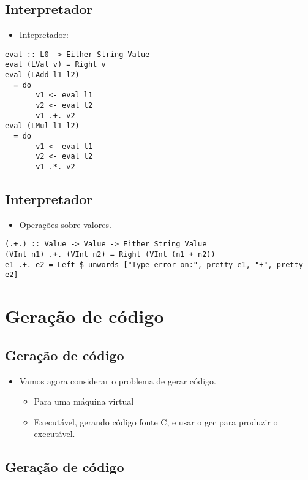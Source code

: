 \documentclass[11pt]{article}
\begin{document}
\subsection*{Interpretador}
\label{sec:org8eb00e1}

\begin{itemize}
\item Intepretador:
\end{itemize}

\begin{verbatim}
eval :: L0 -> Either String Value 
eval (LVal v) = Right v 
eval (LAdd l1 l2) 
  = do 
       v1 <- eval l1 
       v2 <- eval l2 
       v1 .+. v2 
eval (LMul l1 l2) 
  = do 
       v1 <- eval l1
       v2 <- eval l2 
       v1 .*. v2
\end{verbatim}
\subsection*{Interpretador}
\label{sec:orga4fd4e2}

\begin{itemize}
\item Operações sobre valores.
\end{itemize}

\begin{verbatim}
(.+.) :: Value -> Value -> Either String Value 
(VInt n1) .+. (VInt n2) = Right (VInt (n1 + n2))
e1 .+. e2 = Left $ unwords ["Type error on:", pretty e1, "+", pretty e2] 
\end{verbatim}
\section*{Geração de código}
\label{sec:orge2d537e}

\subsection*{Geração de código}
\label{sec:org542baca}

\begin{itemize}
\item Vamos agora considerar o problema de gerar código. 
\begin{itemize}
\item Para uma máquina virtual
\item Executável, gerando código fonte C, e usar o gcc para produzir o executável.
\end{itemize}
\end{itemize}
\subsection*{Geração de código}
\label{sec:org97ac07e}
\end{document}
